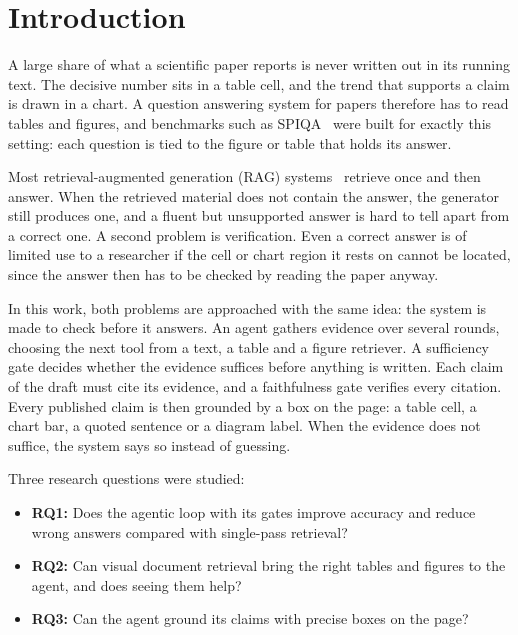 \section{Introduction}
\label{sec:intro}

A large share of what a scientific paper reports is never written out in its running
text. The decisive number sits in a table cell, and the trend that supports a claim is
drawn in a chart. A question answering system for papers therefore has to read tables
and figures, and benchmarks such as SPIQA~\cite{pramanick2024spiqa} were built for
exactly this setting: each question is tied to the figure or table that holds its
answer.

Most retrieval-augmented generation (RAG) systems~\cite{lewis2020rag} retrieve once and
then answer. When the retrieved material does not contain the answer, the generator
still produces one, and a fluent but unsupported answer is hard to tell apart from a
correct one. A second problem is verification. Even a correct answer is of limited use
to a researcher if the cell or chart region it rests on cannot be located, since the
answer then has to be checked by reading the paper anyway.

In this work, both problems are approached with the same idea: the system is made to
check before it answers. An agent gathers evidence over several rounds, choosing the
next tool from a text, a table and a figure retriever. A sufficiency gate decides
whether the evidence suffices before anything is written. Each claim of the draft must
cite its evidence, and a faithfulness gate verifies every citation. Every published
claim is then grounded by a box on the page: a table cell, a chart bar, a quoted
sentence or a diagram label. When the evidence does not suffice, the system says so
instead of guessing.

Three research questions were studied:
\begin{itemize}
    \item \textbf{RQ1:} Does the agentic loop with its gates improve accuracy and reduce
    wrong answers compared with single-pass retrieval?
    \item \textbf{RQ2:} Can visual document retrieval bring the right tables and figures
    to the agent, and does seeing them help?
    \item \textbf{RQ3:} Can the agent ground its claims with precise boxes on the page?
\end{itemize}


